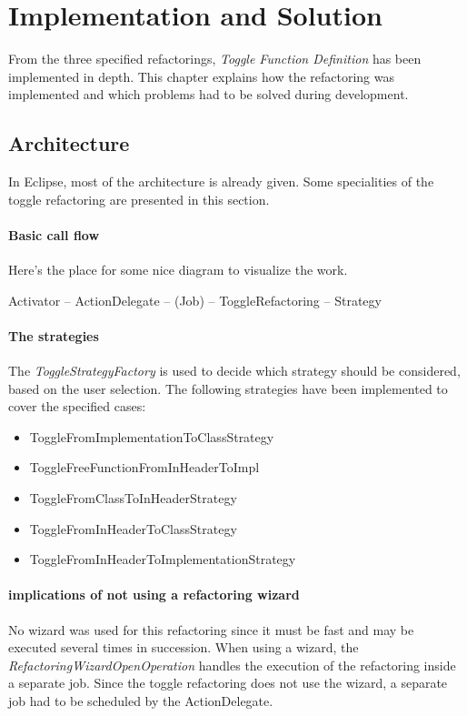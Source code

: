 \chapter{Implementation and Solution}
\thispagestyle{fancy}

From the three specified refactorings, \textit{Toggle Function Definition} has 
been implemented in depth. This chapter explains how the refactoring was 
implemented and which problems had to be solved during development.

\section{Architecture}

In Eclipse, most of the architecture is already given. Some specialities of the 
toggle refactoring are presented in this section.

\subsubsection{Basic call flow}
Here's the place for some nice diagram to visualize the work.

Activator -- ActionDelegate -- (Job) -- ToggleRefactoring -- Strategy

\subsubsection{The strategies}
The \textit{ToggleStrategyFactory} is used to decide which strategy should be 
considered, based on the user selection. The following strategies have been 
implemented to cover the specified cases:

\begin{itemize}
\item ToggleFromImplementationToClassStrategy
\item ToggleFreeFunctionFromInHeaderToImpl
\item ToggleFromClassToInHeaderStrategy
\item ToggleFromInHeaderToClassStrategy
\item ToggleFromInHeaderToImplementationStrategy
\end{itemize}

\subsubsection{implications of not using a refactoring wizard}
No wizard was used for this refactoring since it must be fast and may be 
executed several times in succession. When using a wizard, the 
\textit{RefactoringWizardOpenOperation} handles the execution of the refactoring 
inside a separate job. Since the toggle refactoring does not use the wizard, a 
separate job had to be scheduled by the ActionDelegate.

